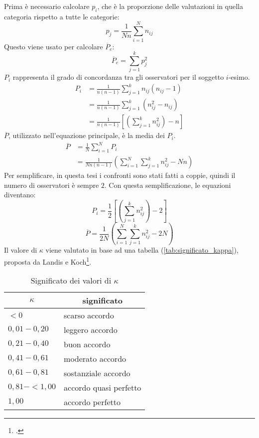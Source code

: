 Prima è necessario calcolare $p_i$, che è la proporzione delle valutazioni in quella categoria rispetto a tutte le categorie:
\begin{equation*}
p_j = \frac{1}{Nn}\sum_{i=1}^N n_{ij}
\end{equation*}
Questo viene usato per calcolare $\overline{P}_e$:
\begin{equation}
\overline{P}_e = \sum_{j=1}^k p^2_j
\end{equation}
$P_i$ rappresenta il grado di concordanza tra gli osservatori per il soggetto $i$-esimo.
\begin{align*}
P_i &= \frac{1}{n(n-1)}\sum_{j=1}^k n_{ij}(n_{ij}-1) \\
&= \frac{1}{n(n-1)}\sum_{j=1}^k (n^2_{ij}-n_{ij}) \\
&= \frac{1}{n(n-1)}[(\sum_{j=1}^k n^2_{ij}) - n]
\end{align*}
$\overline{P}$, utilizzato nell'equazione principale, è la media dei $P_i$.
\begin{align*}
\overline{P} &= \frac{1}{N}\sum_{i=1}^N P_i \\
&= \frac{1}{Nn(n-1)}(\sum_{i=1}^N\sum_{j=1}^k n^2_{ij} - Nn)
\end{align*}
Per semplificare, in questa tesi i confronti sono stati fatti a coppie, quindi il numero di osservatori è sempre $2$. Con questa semplificazione, le equazioni diventano:
\begin{equation}
P_i = \frac{1}{2}[(\sum_{j=1}^k n^2_{ij}) - 2]
\end{equation}
\begin{equation}
\overline{P} = \frac{1}{2N}(\sum_{i=1}^N\sum_{j=1}^k n^2_{ij} - 2N)
\end{equation}
Il valore di $\kappa$ viene valutato in base ad una tabella (\vref*{tab:significato_kappa}), proposta da Landis e Koch\footcite{Landis1977}.

\begin{table}[ht]
\centering
\caption{Significato dei valori di $\kappa$}
\label{tab:significato_kappa}
\begin{tabular}{ll}
\toprule
\multicolumn{1}{c}{\textbf{$\kappa$}} & \multicolumn{1}{c}{significato} \\
\midrule
$< 0$ & scarso accordo \\
$0,01 - 0,20$ & leggero accordo \\
$0,21 - 0,40$ & buon accordo \\
$0,41 - 0,61$ & moderato accordo \\
$0,61 - 0,81$ & sostanziale accordo \\
$0,81 - < 1,00$ & accordo quasi perfetto \\
$1,00$ & accordo perfetto \\
\bottomrule
\end{tabular}
\end{table}